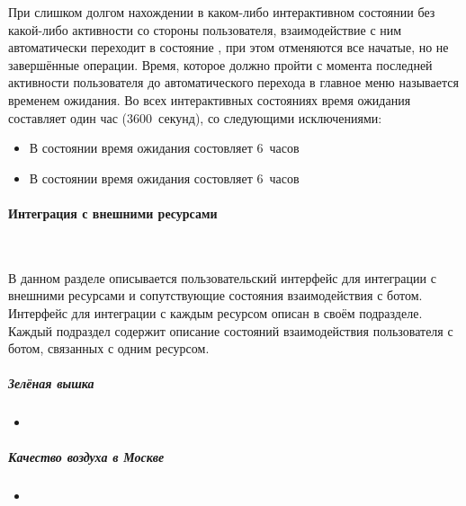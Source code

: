         При слишком долгом нахождении в каком-либо интерактивном состоянии без какой-либо активности
        со стороны пользователя, взаимодействие с ним автоматически переходит в состояние
        \hyperref[itm:req:ui:states:mainmenu]
        {}, при этом отменяются все начатые, но не завершённые операции.
        Время, которое должно пройти с момента последней активности пользователя до
        автоматического перехода в главное меню называется временем ожидания. Во всех интерактивных
        состояниях время ожидания составляет один час (3600~секунд), со следующими исключениями:
        \begin{itemize}
            \item
                В состоянии
                \hyperref[itm:req:ui:states:edit-note]
                {}
                время ожидания состовляет 6~часов
            \item
                В состоянии
                \hyperref[itm:req:ui:states:create-note]
                {}
                время ожидания состовляет 6~часов
        \end{itemize}

        \paragraph{Интеграция с внешними ресурсами}
            \label{par:req:ui:states:integrations}
            ~\par
            В данном разделе описывается пользовательский интерфейс для интеграции с внешними
            ресурсами и сопутствующие состояния взаимодействия с ботом.
            Интерфейс для интеграции с каждым ресурсом описан в своём подразделе.
            Каждый подраздел содержит описание состояний взаимодействия пользователя с ботом,
            связанных с одним ресурсом.

            \subparagraph{Зелёная вышка}
                \begin{itemize}
                    \item
                \end{itemize}

            \subparagraph{Качество воздуха в Москве}
                \begin{itemize}
                    \item
                \end{itemize}

